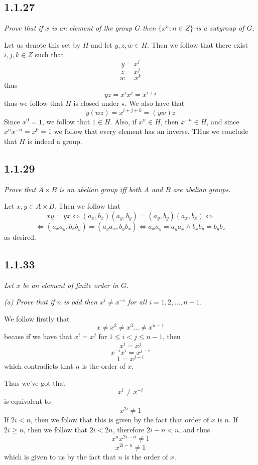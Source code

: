 \documentclass[11pt,oneside,titlepage]{book}
\DeclareMathOperator \lra {\Leftrightarrow}
\begin{document}
\subsection*{1.1.27}

\textit{Prove that if $x$ is an element of the group $G$ then $\{x^n: n \in Z\}$ is
  a subgroup of $G$.}

Let us denote this set by $H$ and let $y, z, w \in H$.
Then we follow that there exist $i, j, k \in Z$ such that
$$y = x^i$$
$$z = x^j$$
$$w = x^k$$
thus
$$yz = x^i x^j = x^{i + j}$$
thus we follow that $H$ is closed under $\star$. We also have that
$$y(wz) = x^{i + j + k} = (yw)z$$
Since $x^0 = 1$, we follow that $1 \in H$. Also, if $x^n \in H$, then $x^{-n} \in H$, and
since $x^n x^{-n} = x^0 = 1$ we follow that every element has an inverse. THus we
conclude that $H$ is indeed a group.

\subsection*{1.1.29}

\textit{Prove that $A \times B$ is an abelian group iff both $A$ and $B$ are
  abelian groups.}

Let $x, y \in A \times B$. Then we follow that
$$xy = yx \lra (a_x, b_x) (a_y, b_y ) = (a_y, b_y) (a_x, b_x ) \lra $$
$$ \lra (a_x a_y, b_x b_y) = (a_y a_x, b_y b_x) \lra a_x a_y = a_y a_x \land b_x b_y = b_y b_x$$
as desired.

\subsection*{1.1.33}

\textit{Let $x$ be an element of finite order in $G$.}

\textit{(a) Prove that if $n$ is odd then $x^i \neq x^{-i}$ for all $i = 1, 2, ..., n - 1$.}

We follow firstly that
$$x \neq x^2 \neq x^3 ... \neq x^{n - 1}$$
becase if we have that $x^i = x^j$ for $1 \leq i < j \leq n - 1$, then
$$x^i = x^j$$
$$x^{-i} x^i  = x^{j- i}$$
$$1  = x^{j- i}$$
which contradicts that $n$ is the order of $x$.

Thus we've got that 
$$x^i \neq x^{-i}$$
is equivalent to 
$$x^{2i} \neq 1$$
If $2i < n$, then we folow that this is given by the fact that order of $x$ is $n$. If $2i \geq n$,
then we follow that $2i < 2n$, therefore $2i - n < n$, and thus 
$$x^n x^{2i - n} \neq 1$$
$$x^{2i - n} \neq 1$$
which is given to us by the fact that $n$ is the order of $x$.
\end{document}
